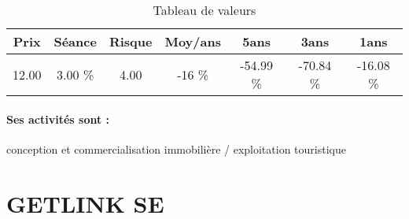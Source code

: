 \documentclass[11pt,a4paper]{report}%
\begin{document}
\begin{table}[H]
  \centering
    \begin{tabular}{|c|c|c|c|c|c|c|}
    \hline
    Prix & Séance & Risque  & Moy/ans & 5ans & 3ans & 1ans \\
    \hline
    12.00 &    3.00 \%    & 4.00 & -16 \% & -54.99 \% & -70.84 \% & -16.08 \% \\
    \hline
    \end{tabular}%
        \label{tab:table_PIERRE VACANCES}%
      \caption{Tableau de valeurs}
\end{table}%

\paragraph{Ses activités sont : } conception et commercialisation immobilière / exploitation touristique 
    
    \newpage

\section{GETLINK SE}
\end{document}
